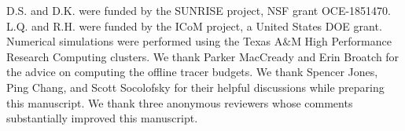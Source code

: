 \documentclass[draft]{agujournal2019}
\begin{document}
%

%

\acknowledgments
D.S. and D.K. were funded by the SUNRISE project, NSF grant OCE-1851470. L.Q. and R.H. were funded by the ICoM project, a United States DOE grant. Numerical simulations were performed using the Texas A$\&$M High Performance Research Computing clusters. We thank Parker MacCready and Erin Broatch for the advice on computing the offline tracer budgets. We thank Spencer Jones, Ping Chang, and Scott Socolofsky for their helpful discussions while preparing this manuscript. We thank three anonymous reviewers whose comments substantially improved this manuscript. 



%
%




%
%
%
%
%
\end{document}
